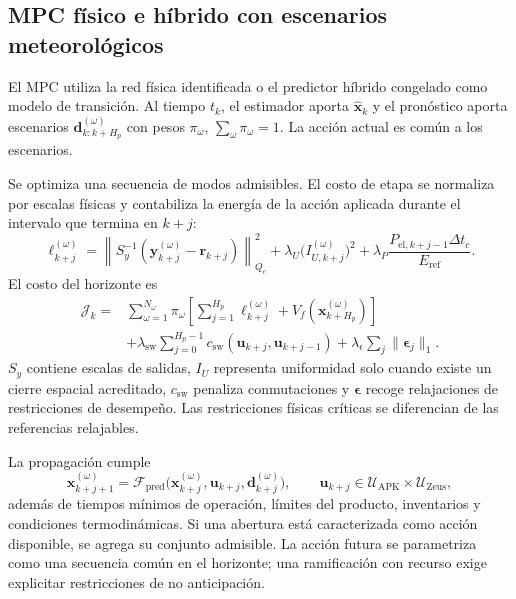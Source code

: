 \subsection{MPC físico e híbrido con escenarios meteorológicos}
\label{met:mpc}

El MPC utiliza la red física identificada o el predictor híbrido congelado como modelo de transición. Al tiempo $t_k$, el estimador aporta $\widehat{\mathbf x}_k$ y el pronóstico aporta escenarios $\mathbf d^{(\omega)}_{k:k+H_p}$ con pesos $\pi_\omega$, $\sum_\omega\pi_\omega=1$. La acción actual es común a los escenarios.

Se optimiza una secuencia de modos admisibles. El costo de etapa se normaliza por escalas físicas y contabiliza la energía de la acción aplicada durante el intervalo que termina en $k+j$:
\begin{equation}
\ell_{k+j}^{(\omega)}=
\left\|
S_y^{-1}(\mathbf y_{k+j}^{(\omega)}-\mathbf r_{k+j})
\right\|_{Q_c}^{2}
+\lambda_U\bigl(I_{U,k+j}^{(\omega)}\bigr)^{2}
+\lambda_P
\frac{P_{\mathrm{el},k+j-1}\Delta t_c}{E_{\mathrm{ref}}}.
\label{met:costo_etapa}
\end{equation}
El costo del horizonte es
\begin{equation}
\begin{split}
\mathcal J_k={}&
\sum_{\omega=1}^{N_\omega}\pi_\omega
\left[
\sum_{j=1}^{H_p}
\ell_{k+j}^{(\omega)}
+V_f(\mathbf x_{k+H_p}^{(\omega)})
\right]\\
&+\lambda_{\mathrm{sw}}\sum_{j=0}^{H_p-1}
c_{\mathrm{sw}}(\mathbf u_{k+j},\mathbf u_{k+j-1})
+\lambda_\epsilon\sum_j\|\boldsymbol\epsilon_j\|_1.
\end{split}
\label{met:costo_mpc}
\end{equation}
$S_y$ contiene escalas de salidas, $I_U$ representa uniformidad solo cuando existe un cierre espacial acreditado, $c_{\mathrm{sw}}$ penaliza conmutaciones y $\boldsymbol\epsilon$ recoge relajaciones de restricciones de desempeño. Las restricciones físicas críticas se diferencian de las referencias relajables.

La propagación cumple
\begin{equation}
\mathbf x_{k+j+1}^{(\omega)}
=\mathcal F_{\mathrm{pred}}
\bigl(\mathbf x_{k+j}^{(\omega)},
\mathbf u_{k+j},\mathbf d_{k+j}^{(\omega)}\bigr),
\qquad
\mathbf u_{k+j}\in
\mathcal U_{\mathrm{APK}}\times\mathcal U_{\mathrm{Zeus}},
\label{met:restricciones_mpc}
\end{equation}
además de tiempos mínimos de operación, límites del producto, inventarios y condiciones termodinámicas. Si una abertura está caracterizada como acción disponible, se agrega su conjunto admisible. La acción futura se parametriza como una secuencia común en el horizonte; una ramificación con recurso exige explicitar restricciones de no anticipación.

